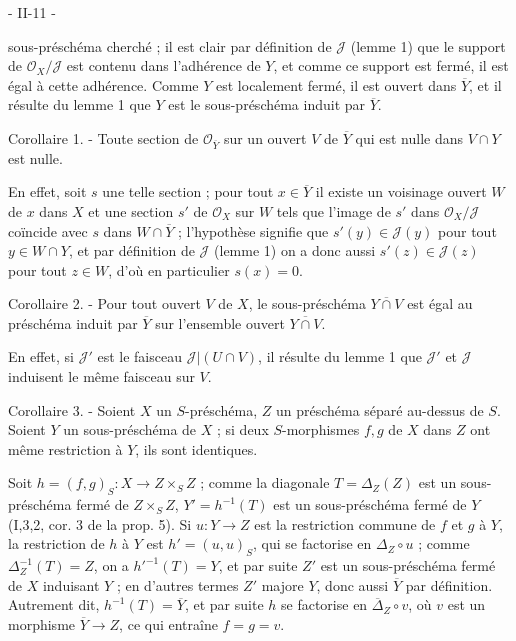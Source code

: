 - II-11 -

sous-préschéma cherché ; il est clair par définition de $\mathcal{J}$ (lemme 1) que le support de $\mathcal{O}_X/\mathcal{J}$ est contenu dans l'adhérence de $Y$, et comme ce support est fermé, il est égal à cette adhérence. Comme $Y$ est localement fermé, il est ouvert dans $\overline{Y}$, et il résulte du lemme 1 que $Y$ est le sous-préschéma induit par $\overline{Y}$.

Corollaire 1. - Toute section de $\mathcal{O}_{\overline{Y}}$ sur un ouvert $V$ de $\overline{Y}$ qui est nulle dans $V \cap Y$ est nulle.

En effet, soit $s$ une telle section ; pour tout $x \in \overline{Y}$ il existe un voisinage ouvert $W$ de $x$ dans $X$ et une section $s'$ de $\mathcal{O}_X$ sur $W$ tels que l'image de $s'$ dans $\mathcal{O}_X/\mathcal{J}$ coïncide avec $s$ dans $W \cap \overline{Y}$ ; l'hypothèse signifie que $s'(y) \in \mathcal{J}(y)$ pour tout $y \in W \cap Y$, et par définition de $\mathcal{J}$ (lemme 1) on a donc aussi $s'(z) \in \mathcal{J}(z)$ pour tout $z \in W$, d'où en particulier $s(x)=0$.

Corollaire 2. - Pour tout ouvert $V$ de $X$, le sous-préschéma $\overline{Y \cap V}$ est égal au préschéma induit par $\overline{Y}$ sur l'ensemble ouvert $\overline{Y \cap V}$.

En effet, si $\mathcal{J}'$ est le faisceau $\mathcal{J}|(U \cap V)$, il résulte du lemme 1 que $\mathcal{J}'$ et $\mathcal{J}$ induisent le même faisceau sur $V$.

Corollaire 3. - Soient $X$ un $S$-préschéma, $Z$ un préschéma séparé au-dessus de $S$. Soient $Y$ un sous-préschéma de $X$ ; si deux $S$-morphismes $f, g$ de $X$ dans $Z$ ont même restriction à $Y$, ils sont identiques.

Soit $h=(f,g)_S : X \to Z \times_S Z$ ; comme la diagonale $T=\Delta_Z(Z)$ est un sous-préschéma fermé de $Z \times_S Z$, $Y'=h^{-1}(T)$ est un sous-préschéma fermé de $Y$ (I,3,2, cor. 3 de la prop. 5). Si $u:Y \to Z$ est la restriction commune de $f$ et $g$ à $Y$, la restriction de $h$ à $Y$ est $h'=(u,u)_S$, qui se factorise en $\Delta_Z \circ u$ ; comme $\Delta_Z^{-1}(T)=Z$, on a $h'^{-1}(T)=Y$, et par suite $Z'$ est un sous-préschéma fermé de $X$ induisant $Y$ ; en d'autres termes $Z'$ majore $Y$, donc aussi $\overline{Y}$ par définition. Autrement dit, $h^{-1}(T)=\overline{Y}$, et par suite $h$ se factorise en $\overline{\Delta}_Z \circ v$, où $v$ est un morphisme $\overline{Y} \to Z$, ce qui entraîne $f=g=v$.

